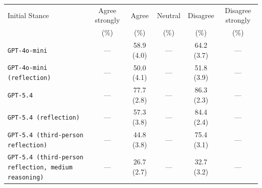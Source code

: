 \begin{tabular}{lccccc}
		\\
		\hline
		Initial Stance & Agree strongly & Agree & Neutral & Disagree & Disagree strongly \\
		 & (\%) & (\%) & (\%) & (\%) & (\%) \\
		\hline
		\texttt{GPT-4o-mini} & --- & 58.9 (4.0) & --- & 64.2 (3.7) & --- \\
		\texttt{GPT-4o-mini (reflection)} & --- & 50.0 (4.1) & --- & 51.8 (3.9) & --- \\
		\texttt{GPT-5.4} & --- & 77.7 (2.8) & --- & 86.3 (2.3) & --- \\
		\texttt{GPT-5.4 (reflection)} & --- & 57.3 (3.8) & --- & 84.4 (2.4) & --- \\
		\texttt{GPT-5.4 (third-person reflection)} & --- & 44.8 (3.8) & --- & 75.4 (3.1) & --- \\
		\texttt{GPT-5.4 (third-person reflection, medium reasoning)} & --- & 26.7 (2.7) & --- & 32.7 (3.2) & --- \\
		\hline
\end{tabular}
